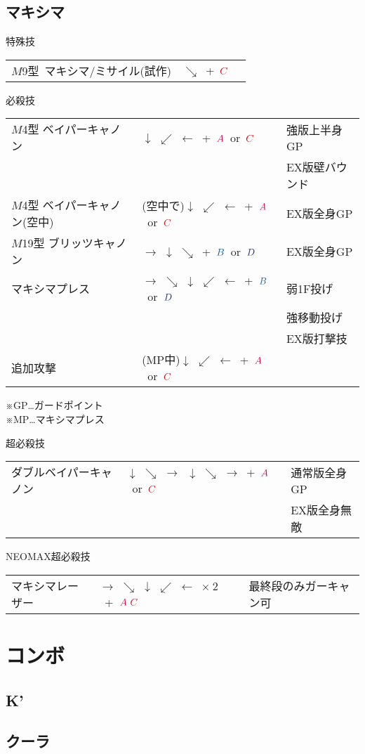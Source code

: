 \documentclass[a4j,11pt]{jarticle}
\def\A{\textcolor{Acolor}{A}}
\def\C{\textcolor{Ccolor}{C}}
\def\B{\textcolor{Bcolor}{B}}
\def\D{\textcolor{Dcolor}{D}}
\def\hado{$\downarrow$ $\searrow$ $\rightarrow$}%
\def\tatsu{$\downarrow$ $\swarrow$ $\leftarrow$}%
\def\syoryu{$\rightarrow$ $\downarrow$ $\searrow$}%
\def\gyakuyoga{$\rightarrow$ $\searrow$ $\downarrow$ $\swarrow$ $\leftarrow$}%
\begin{document}
\subsection{マキシマ}
\begin{itembox}[l]{特殊技}
\begin{tabular}{lll}
$M$9型\ マキシマ/ミサイル(試作)&$\searrow$\ +\ $\C$&%
\end{tabular}
\end{itembox}
\begin{itembox}[l]{必殺技}
\begin{tabular}{lll}
$M$4型 ベイパーキャノン&\tatsu\ +\ $\A$\ or\ $\C$&強版上半身GP\\%
&&EX版壁バウンド\\
$M$4型 ベイパーキャノン(空中)&(空中で)\tatsu\ +\ $\A$\ or\ $\C$&EX版全身GP\\%
$M$19型 ブリッツキャノン&\syoryu\ +\ $\B$\ or\ $\D$&EX版全身GP\\%
マキシマプレス&\gyakuyoga\ +\ $\B$\ or\ $\D$&弱1F投げ\\%
&&強移動投げ\\
&&EX版打撃技\\
追加攻撃&(MP中)\tatsu\ +\ $\A$\ or\ $\C$&
\end{tabular}
\end{itembox}
※GP…ガードポイント\\
※MP…マキシマプレス\\
\begin{itembox}[l]{超必殺技}
\begin{tabular}{lll}
ダブルベイパーキャノン&\hado\ \hado\ +\ $\A$\ or\ $\C$&通常版全身GP\\%
&&EX版全身無敵
\end{tabular}
\end{itembox}
\begin{itembox}[l]{NEOMAX超必殺技}
\begin{tabular}{lll}
マキシマレーザー&\gyakuyoga\ $\times\ 2$\ +\ $\A\ \C$&最終段のみガーキャン可%
\end{tabular}
\end{itembox}
\newpage
\section{コンボ}
\subsection{K'}
\subsection{クーラ}
\end{document}
